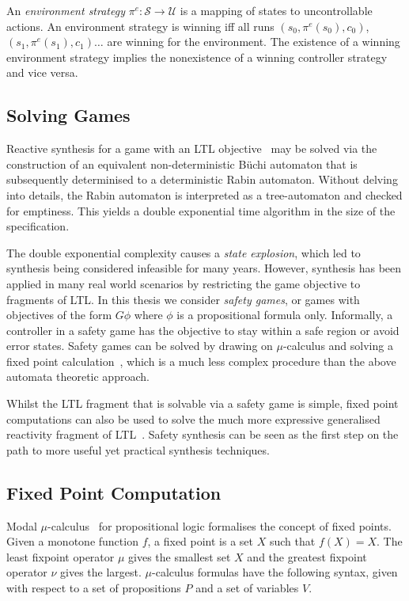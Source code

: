 An \emph{environment strategy} $\pi^e : \mathcal{S} \to \mathcal{U}$ is a mapping of states to uncontrollable actions. An environment strategy is winning
iff all runs $(s_0, \pi^e(s_0), c_0)$, $(s_1, \pi^e(s_1), c_1) \dots$ are winning for the environment. The existence of a winning environment strategy implies the nonexistence of a winning controller strategy and vice versa.

\subsection{Solving Games}

Reactive synthesis for a game with an LTL objective~\cite{Pnueli89} may be solved via the construction of an equivalent non-deterministic B\"uchi automaton that is subsequently determinised to a deterministic Rabin automaton. Without delving into details, the Rabin automaton is interpreted as a tree-automaton and checked for emptiness. This yields a double exponential time algorithm in the size of the specification.

The double exponential complexity causes a \emph{state explosion}, which led to synthesis being considered infeasible for many years. However, synthesis has been applied in many real world scenarios by restricting the game objective to fragments of LTL. In this thesis we consider \emph{safety games}, or games with objectives of the form $G \phi$ where $\phi$ is a propositional formula only. Informally, a controller in a safety game has the objective to stay within a safe region or avoid error states. Safety games can be solved by drawing on $\mu$-calculus and solving a fixed point calculation~\cite{Asarin95}, which is a much less complex procedure than the above automata theoretic approach. 

Whilst the LTL fragment that is solvable via a safety game is simple, fixed point computations can also be used to solve the much more expressive generalised reactivity fragment of LTL~\cite{Piterman15}. Safety synthesis can be seen as the first step on the path to more useful yet practical synthesis techniques.


\subsection{Fixed Point Computation}

Modal $\mu$-calculus~\cite{Kozen82} for propositional logic formalises the concept of fixed points. Given a monotone function $f$, a fixed point is a set $X$ such that $f(X) = X$. The least fixpoint operator $\mu$ gives the smallest set $X$ and the greatest fixpoint operator $\nu$ gives the largest. $\mu$-calculus formulas have the following syntax, given with respect to a set of propositions $P$ and a set of variables $V$.

